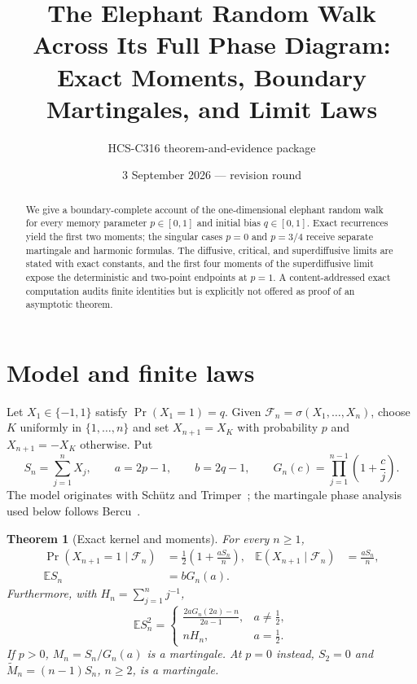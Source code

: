 \documentclass[9pt]{extarticle}
\title{The Elephant Random Walk Across Its Full Phase Diagram:\\Exact Moments, Boundary Martingales, and Limit Laws}
\author{HCS-C316 theorem-and-evidence package}
\date{3 September 2026 --- revision round \CRevisionRound}
\newtheorem{theorem}{Theorem}
\newcommand{\E}{\mathbb E}
\newcommand{\F}{\mathcal F}
\begin{document}
\maketitle
\begin{abstract}
We give a boundary-complete account of the one-dimensional elephant random walk for every memory parameter $p\in[0,1]$ and initial bias $q\in[0,1]$.  Exact recurrences yield the first two moments; the singular cases $p=0$ and $p=3/4$ receive separate martingale and harmonic formulas.  The diffusive, critical, and superdiffusive limits are stated with exact constants, and the first four moments of the superdiffusive limit expose the deterministic and two-point endpoints at $p=1$.  A content-addressed exact computation audits finite identities but is explicitly not offered as proof of an asymptotic theorem.
\end{abstract}

\section{Model and finite laws}
Let $X_1\in\{-1,1\}$ satisfy $\Pr(X_1=1)=q$.  Given
$\F_n=\sigma(X_1,\ldots,X_n)$, choose $K$ uniformly in
$\{1,\ldots,n\}$ and set $X_{n+1}=X_K$ with probability $p$ and
$X_{n+1}=-X_K$ otherwise.  Put
\[
 S_n=\sum_{j=1}^nX_j,\qquad a=2p-1,\qquad b=2q-1,
 \qquad G_n(c)=\prod_{j=1}^{n-1}\left(1+\frac cj\right).
\]
The model originates with Sch\"utz and Trimper~\cite{schutz}; the
martingale phase analysis used below follows Bercu~\cite{bercu}.

\begin{theorem}[Exact kernel and moments]\label{thm:finite}
For every $n\geq1$,
\begin{align}
 \Pr(X_{n+1}=1\mid\F_n)&=\frac12\left(1+\frac{aS_n}{n}\right),
 &\E(X_{n+1}\mid\F_n)&=\frac{aS_n}{n},\label{eq:kernel}\\
 \E S_n&=bG_n(a).\label{eq:mean}
\end{align}
Furthermore, with $H_n=\sum_{j=1}^n j^{-1}$,
\begin{equation}\label{eq:second}
 \E S_n^2=
 \begin{cases}
 \displaystyle\frac{2aG_n(2a)-n}{2a-1},&a\neq\tfrac12,\\[5pt]
 nH_n,&a=\tfrac12.
 \end{cases}
\end{equation}
If $p>0$, $M_n=S_n/G_n(a)$ is a martingale.  At $p=0$ instead,
$S_2=0$ and $\widetilde M_n=(n-1)S_n$, $n\geq2$, is a martingale.
\end{theorem}
\end{document}

